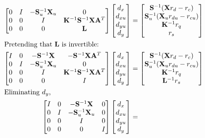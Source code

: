 \documentclass[10pt,a4paper]{article}
\begin{document}
\begin{align*}
\begin{bmatrix}
0 & I & -\mathbf{S}_u^{-1}\mathbf{X}_u & 0 \\
0 & 0 & I & \mathbf{K}^{-1}\mathbf{S}^{-1}\mathbf{X}\mathbf{A}^T \\
0 & 0 & 0 & \mathbf{L}
\end{bmatrix}
\begin{bmatrix}d_x \\ d_{xu} \\ d_{yu} \\ d_y\end{bmatrix} &= 
\begin{bmatrix}
\mathbf{S}^{-1}(\mathbf{X}r_d - r_c) \\
\mathbf{S}_u^{-1}(\mathbf{X}_ur_{du} - r_{cu}) \\
\mathbf{K}^{-1}r_q \\
r_s
\end{bmatrix} \\
\intertext{Pretending that $\mathbf{L}$ is invertible:}
\begin{bmatrix}
I & 0 & -\mathbf{S}^{-1}\mathbf{X} & -\mathbf{S}^{-1}\mathbf{X}\mathbf{A}^T \\
0 & I & -\mathbf{S}_u^{-1}\mathbf{X}_u & 0 \\
0 & 0 & I & \mathbf{K}^{-1}\mathbf{S}^{-1}\mathbf{X}\mathbf{A}^T \\
0 & 0 & 0 & I
\end{bmatrix}
\begin{bmatrix}d_x \\ d_{xu} \\ d_{yu} \\ d_y\end{bmatrix} &= 
\begin{bmatrix}
\mathbf{S}^{-1}(\mathbf{X}r_d - r_c) \\
\mathbf{S}_u^{-1}(\mathbf{X}_ur_{du} - r_{cu}) \\
\mathbf{K}^{-1}r_q \\
\mathbf{L}^{-1}r_s
\end{bmatrix} \\
\intertext{Eliminating $d_y$,}
\begin{bmatrix}
I & 0 & -\mathbf{S}^{-1}\mathbf{X} & 0 \\
0 & I & -\mathbf{S}_u^{-1}\mathbf{X}_u & 0 \\
0 & 0 & I & 0 \\
0 & 0 & 0 & I
\end{bmatrix}
\begin{bmatrix}d_x \\ d_{xu} \\ d_{yu} \\ d_y\end{bmatrix} &= 

\end{align*}
\end{document}

